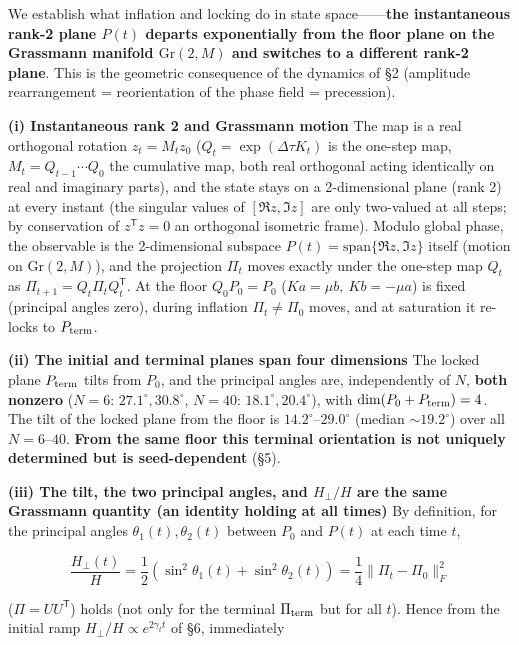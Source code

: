 \documentclass[
  a4paper,
]{ltjsarticle}
\begin{document}
We establish what inflation and locking do in state
space------\textbf{the instantaneous rank-2 plane \(P(t)\) departs
exponentially from the floor plane on the Grassmann manifold
\(\mathrm{Gr}(2,M)\) and switches to a different rank-2 plane}. This is
the geometric consequence of the dynamics of §2 (amplitude rearrangement
= reorientation of the phase field = precession).

\textbf{(i) Instantaneous rank 2 and Grassmann motion} The map is a real
orthogonal rotation \(z_t=M_t z_0\) (\(Q_t=\exp(\Delta\tau K_t)\) is the
one-step map, \(M_t=Q_{t-1}\cdots Q_0\) the cumulative map, both real
orthogonal acting identically on real and imaginary parts), and the
state stays on a 2-dimensional plane (rank 2) at every instant (the
singular values of \([\Re z,\Im z]\) are only two-valued at all steps;
by conservation of \(z^{\mathsf T}z=0\) an orthogonal isometric frame).
Modulo global phase, the observable is the 2-dimensional subspace
\(P(t)=\mathrm{span}\{\Re z,\Im z\}\) itself (motion on
\(\mathrm{Gr}(2,M)\)), and the projection \(\Pi_t\) moves exactly under
the one-step map \(Q_t\) as \(\Pi_{t+1}=Q_t\Pi_tQ_t^{\mathsf T}\). At
the floor \(Q_0P_0=P_0\) (\(Ka=\mu b,\ Kb=-\mu a\)) is fixed (principal
angles zero), during inflation \(\Pi_t\neq\Pi_0\) moves, and at
saturation it re-locks to \(P_{\rm term}\).

\textbf{(ii) The initial and terminal planes span four dimensions} The
locked plane \(P_{\rm term}\) tilts from \(P_0\), and the principal
angles are, independently of \(N\), \textbf{both nonzero} (\(N=6\):
\(27.1^\circ,30.8^\circ\), \(N=40\): \(18.1^\circ,20.4^\circ\)), with
\(\dim(P_0+P_{\rm term})=4\). The tilt of the locked plane from the
floor is \(14.2^\circ\)--\(29.0^\circ\) (median \(\sim19.2^\circ\)) over
all \(N=6\)--\(40\). \textbf{From the same floor this terminal
orientation is not uniquely determined but is seed-dependent} (§5).

\textbf{(iii) The tilt, the two principal angles, and \(H_\perp/H\) are
the same Grassmann quantity (an identity holding at all times)} By
definition, for the principal angles \(\theta_1(t),\theta_2(t)\) between
\(P_0\) and \(P(t)\) at each time \(t\),

\[\frac{H_\perp(t)}{H}=\frac12\left(\sin^2\theta_1(t)+\sin^2\theta_2(t)\right)=\frac14\big\|\Pi_t-\Pi_0\big\|_F^2\]

(\(\Pi=UU^{\mathsf T}\)) holds (not only for the terminal
\(\Pi_{\rm term}\) but for all \(t\)). Hence from the initial ramp
\(H_\perp/H\propto e^{2\gamma_t t}\) of §6, immediately
\end{document}
